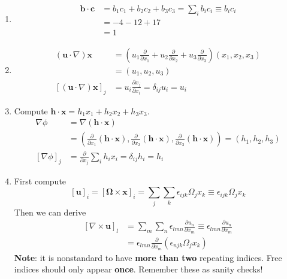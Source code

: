 \documentclass[a4paper]{article}
\begin{document}
\begin{enumerate}[label=\alph*.]
	\item \begin{align*}
		\pmb{b } \cdot \pmb{c } & = b_{1}c_{1} + b_{2}c_{2} + b_{3}c_{3} = \sum_{i} b_{i}c_{i} \equiv b_{i}c_{i} \\
					& = -4 - 12 + 17 \\
					& = 1
	\end{align*}
	\item \begin{align*}
		\!\left( \pmb{u} \cdot \nabla \right)\pmb{x} & = \!\left( u_{1}\frac{\partial }{\partial x_{1}} + u_{2}\frac{\partial }{\partial x_{2}} + u_{3}\frac{\partial }{\partial x_{3}} \right) \!\left( x_{1},x_{2},x_{3} \right) \\
							     & = \!\left( u_{1},u_{2},u_{3} \right) \\
							    \!\left[ \!\left( \pmb{u} \cdot \nabla \right)\pmb{x} \right]_{j} & = u_{i}\frac{\partial x_{j}}{\partial x_{i}} = \delta_{ij}u_{i} = u_{i}
	\end{align*}
	\item Compute \( \pmb{h} \cdot \pmb{x} = h_{1}x_{1} + h_{2}x_{2} + h_{3}x_{3} \).
	\begin{align*}
		\nabla \phi & = \nabla \!\left( \pmb{h} \cdot \pmb{x} \right) \\
		 & = \!\left( \frac{\partial }{\partial x_{1}}\!\left( \pmb{h} \cdot \pmb{x} \right), \frac{\partial }{\partial x_{2}}\!\left( \pmb{h} \cdot \pmb{x} \right), \frac{\partial }{\partial x_{3}}\!\left( \pmb{h} \cdot \pmb{x} \right) \right) = \!\left( h_{1},h_{2},h_{3} \right) \\ 
		\!\left[ \nabla \phi \right]_{j} & = \frac{\partial }{\partial x_{j}}\sum_{i} h_{i}x_{i} = \delta_{ij}h_{i} = h_{i}
	\end{align*}
	\item First compute
	\[
		\!\left[ \pmb{u} \right]_{i} = \!\left[ \pmb{\Omega} \times \pmb{x} \right]_{i} = \sum_{j} \sum_{k} \epsilon_{ijk}\Omega_{j}x_{k} \equiv \epsilon_{ijk}\Omega_{j}x_{k} 
	\]
	Then we can derive
	\begin{align*}
		\!\left[ \nabla \times \pmb{u} \right]_{l} & = \sum_{m} \sum_{n} \epsilon_{lmn}\frac{\partial u_{n}}{\partial x_{m}} \equiv \epsilon_{lmn}\frac{\partial u_{n}}{\partial x_{m}} \\
		 & = \epsilon_{lmn}\frac{\partial }{\partial x_{m}}\!\left( \epsilon_{njk}\Omega_{j}x_{k} \right)
	\end{align*}
	\textbf{Note}: it is nonstandard to have \textbf{more than two} repeating indices. Free indices should only appear \textbf{once}. Remember these as sanity checks!

\end{enumerate}
\end{document}
